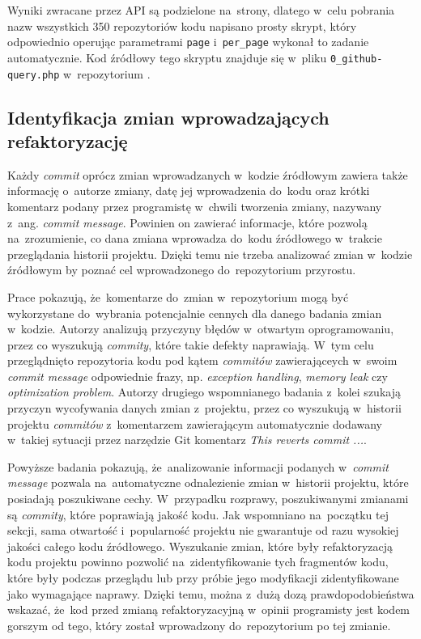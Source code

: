 \documentclass[twoside]{praca}
\begin{document}
Wyniki zwracane przez API są podzielone na~strony, dlatego w~celu pobrania nazw wszystkich 350 repozytoriów kodu napisano prosty skrypt, który odpowiednio operując parametrami \texttt{page} i~\texttt{per\_page} wykonał to zadanie automatycznie. Kod źródłowy tego skryptu znajduje się w~pliku \texttt{0\_github-query.php} w~repozytorium \cite{fracz:refactor-extractor}.

\subsection{Identyfikacja zmian wprowadzających refaktoryzację}
\label{sec:impl:identification-commits}

Każdy \textit{commit} oprócz zmian wprowadzanych w~kodzie źródłowym zawiera także informację o~autorze zmiany, datę jej wprowadzenia do~kodu oraz krótki komentarz podany przez programistę w~chwili tworzenia zmiany, nazywany z~ang. \textit{commit message}. Powinien on zawierać informacje, które pozwolą na~zrozumienie, co dana zmiana wprowadza do~kodu źródłowego w~trakcie przeglądania historii projektu. Dzięki temu nie trzeba analizować zmian w~kodzie źródłowym by poznać cel wprowadzonego do~repozytorium przyrostu.

Prace \cite{ray2014large,shimagaki2016commits} pokazują, że~komentarze do~zmian w~repozytorium mogą być wykorzystane do~wybrania potencjalnie cennych dla danego badania zmian w~kodzie. Autorzy \cite{ray2014large} analizują przyczyny błędów w~otwartym oprogramowaniu, przez co wyszukują \textit{commity}, które takie defekty naprawiają. W~tym celu przeglądnięto repozytoria kodu pod kątem \textit{commitów} zawierająceych w~swoim \textit{commit message} odpowiednie frazy, np. \textit{exception handling}, \textit{memory leak} czy \textit{optimization problem}. Autorzy drugiego wspomnianego badania \cite{shimagaki2016commits} z~kolei szukają przyczyn wycofywania danych zmian z~projektu, przez co wyszukują w~historii projektu \textit{commitów} z~komentarzem zawierającym automatycznie dodawany w~takiej sytuacji przez narzędzie Git komentarz \textit{This reverts \textit{commit} ...}. 

Powyższe badania pokazują, że~analizowanie informacji podanych w~\textit{commit message} pozwala na~automatyczne odnalezienie zmian w~historii projektu, które posiadają poszukiwane cechy. W~przypadku rozprawy, poszukiwanymi zmianami są \textit{commity}, które poprawiają jakość kodu. Jak wspomniano na~początku tej sekcji, sama otwartość i~popularność projektu nie gwarantuje od razu wysokiej jakości całego kodu źródłowego. Wyszukanie zmian, które były refaktoryzacją kodu projektu powinno pozwolić na~zidentyfikowanie tych fragmentów kodu, które były podczas przeglądu lub przy próbie jego modyfikacji zidentyfikowane jako wymagające naprawy. Dzięki temu, można z~dużą dozą prawdopodobieństwa wskazać, że~kod przed zmianą refaktoryzacyjną w~opinii programisty jest kodem gorszym od tego, który został wprowadzony do~repozytorium po tej zmianie.
\end{document}
